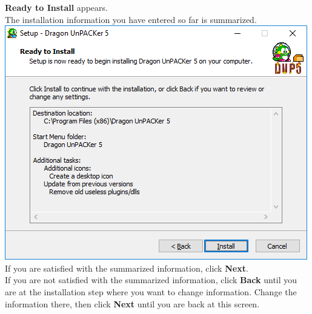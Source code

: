\documentclass[10pt,a4paper,twoside]{book}
\makeatletter
\def\maxwidth#1{\ifdim\Gin@nat@width>#1 #1\else\Gin@nat@width\fi}
\makeatother
\begin{document}
\begin{enumerate}
\begin{minipage}{\linewidth}
\item \textbf{Ready to Install} appears.\\
The installation information you have entered so far is summarized.\\
\includegraphics[width=\maxwidth{9cm}]{install/008-summary}\\
If you are satisfied with the summarized information, click \textbf{Next}.\\
If you are not satisfied with the summarized information, click \textbf{Back} until you are at the
installation step where you want to change information. Change the information there, then
click \textbf{Next} until you are back at this screen.\\
\end{minipage}


\end{enumerate}
\end{document}
